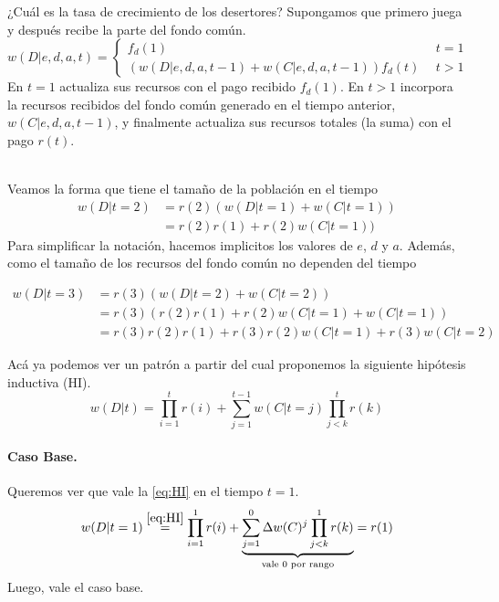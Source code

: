 \documentclass[a4paper,10pt]{article}
\begin{document}
¿Cuál es la tasa de crecimiento de los desertores?
Supongamos que primero juega y después recibe la parte del fondo común.
\begin{equation}
w(D|e,d,a,t) =
\begin{cases}
 f_d(1) & \ \  t=1 \\
 (w(D|e,d,a,t-1) + w(C|e,d,a,t-1)) f_d(t) & \ \  t>1
\end{cases}
\end{equation}
En $t=1$ actualiza sus recursos con el pago recibido $f_d(1)$.
En $t>1$ incorpora la recursos recibidos del fondo común generado en el tiempo anterior, $w(C|e,d,a,t-1)$, y finalmente actualiza sus recursos totales (la suma) con el pago $r(t)$.

\\

Veamos la forma que tiene el tamaño de la población en el tiempo
\begin{align}
w(D|t=2) & = r(2) (w(D|t=1) + w(C|t=1)) \\
& = r(2)r(1) + r(2)w(C|t=1))
\end{align}
Para simplificar la notación, hacemos implicitos los valores de $e$, $d$ y $a$.
Además, como el tamaño de los recursos del fondo común no dependen del tiempo

\begin{align}
w(D|t=3) & = r(3) (w(D|t=2)+w(C|t=2)) \\
& = r(3) (r(2)r(1) + r(2)w(C|t=1) + w(C|t=1) ) \\
& = r(3)r(2)r(1) + r(3)r(2)w(C|t=1) + r(3)w(C|t=2) 
\end{align}

Acá ya podemos ver un patrón a partir del cual proponemos la siguiente hipótesis inductiva (HI).
\begin{equation} \label{eq:HI} \tag{HI} 
w(D|t) = \prod^t_{i=1} r(i) + \sum^{t-1}_{j=1} w(C|t=j)
\prod^t_{j<k} r(k)
\end{equation}

\paragraph{Caso Base.} Queremos ver que vale la \ref{eq:HI} en el tiempo $t=1$.
\begin{equation} 
w(D|t=1) \overset{\ref{eq:HI}}{=} \prod^1_{i=1} r(i) + \underbrace{\sum^{0}_{j=1} \Delta w(C)^j \prod^1_{j<k} r(k) }_{\text{vale $0$ por rango}} = r(1)
\end{equation}
Luego, vale el caso base.
\end{document}
